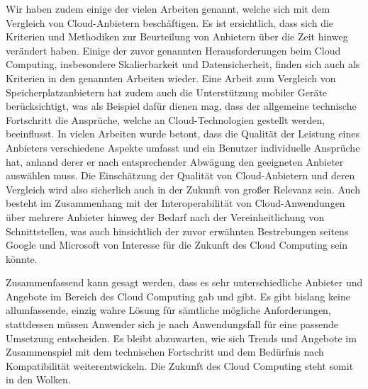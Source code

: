 Wir haben zudem einige der vielen Arbeiten genannt, welche sich mit dem Vergleich von Cloud-Anbietern beschäftigen. 
Es ist ersichtlich, dass sich die Kriterien und Methodiken zur Beurteilung von Anbietern über die Zeit hinweg verändert haben. 
Einige der zuvor genannten Herausforderungen beim Cloud Computing, insbesondere Skalierbarkeit und Datensicherheit, finden sich auch als Kriterien in den genannten Arbeiten wieder. 
Eine Arbeit zum Vergleich von Speicherplatzanbietern hat zudem auch die Unterstützung mobiler Geräte berücksichtigt, was als Beispiel dafür dienen mag, dass der allgemeine technische Fortschritt die Ansprüche, welche an Cloud-Technologien gestellt werden, beeinflusst. 
In vielen Arbeiten wurde betont, dass die Qualität der Leistung eines Anbieters verschiedene Aspekte umfasst und ein Benutzer individuelle Ansprüche hat, anhand derer er nach entsprechender Abwägung den geeigneten Anbieter auswählen muss. 
Die Einschätzung der Qualität von Cloud-Anbietern und deren Vergleich wird also  sicherlich auch in der Zukunft von großer Relevanz sein. 
Auch besteht im Zusammenhang mit der Interoperabilität von Cloud-Anwendungen über mehrere Anbieter hinweg der Bedarf nach der Vereinheitlichung von Schnittstellen, was auch hinsichtlich der zuvor erwähnten Bestrebungen seitens Google und Microsoft von Interesse für die Zukunft des Cloud Computing sein könnte.


Zusammenfassend kann gesagt werden, dass es sehr unterschiedliche Anbieter und Angebote im Bereich des Cloud Computing gab und gibt. 
Es gibt bislang keine allumfassende, einzig wahre Lösung für sämtliche mögliche Anforderungen, stattdessen müssen Anwender sich je nach Anwendungsfall für eine passende Umsetzung entscheiden. 
Es bleibt abzuwarten, wie sich Trends und Angebote im Zusammenspiel mit dem technischen Fortschritt und dem Bedürfnis nach Kompatibilität weiterentwickeln. 
Die Zukunft des Cloud Computing steht somit in den Wolken.
